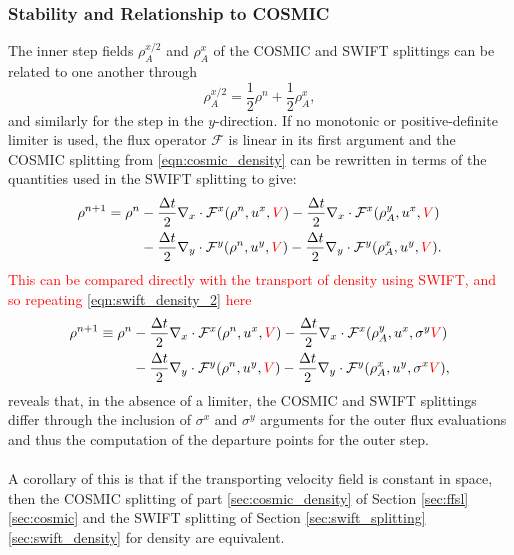 \documentclass{ametsocV6.1}
\newcommand{\change}[1]{\textcolor{red}{#1}}
\begin{document}
\subsubsection{Stability and Relationship to COSMIC}
The inner step fields $\rho_A^{x/2}$ and $\rho_A^{x}$ of the COSMIC and SWIFT splittings can be related to one another through
\begin{equation}
\rho_A^{x/2} = \frac{1}{2}\rho^n + \frac{1}{2}\rho_A^x,
\end{equation}
and similarly for the step in the $y$-direction.
If no monotonic or positive-definite limiter is used, the flux operator $\mathcal{F}$ is linear in its first argument and the COSMIC splitting from \eqref{eqn:cosmic_density} can be rewritten in terms of the quantities used in the SWIFT splitting to give:
\begin{equation} \label{eqn:cosmic_linear}
\begin{split}
\rho^{n+1} = \rho^n & - \frac{\Delta t}{2} \nabla_x\cdot \mathcal{F}^x(\rho^n, u^x,\change{V}) - \frac{\Delta{t}}{2} \nabla_x\cdot \mathcal{F}^x(\rho^y_A, u^x,\change{V}) \\
& - \frac{\Delta{t}}{2} \nabla_y\cdot \mathcal{F}^y(\rho^n, u^y,\change{V}) - \frac{\Delta{t}}{2} \nabla_y\cdot \mathcal{F}^y(\rho^x_A, u^y,\change{V}).
\end{split}
\end{equation}
\change{This can be compared directly with the transport of density using SWIFT, and so repeating \eqref{eqn:swift_density_2} here
\begin{equation}
\begin{split}
\rho^{n+1} \equiv \rho^n & - \frac{\Delta t}{2} \nabla_x\cdot \mathcal{F}^x(\rho^n, u^x, \change{V}) - \frac{\Delta{t}}{2} \nabla_x\cdot \mathcal{F}^x(\rho^y_A, u^x, \sigma^y\change{V}) \\
& - \frac{\Delta{t}}{2} \nabla_y\cdot \mathcal{F}^y(\rho^n, u^y,\change{V}) - \frac{\Delta{t}}{2} \nabla_y\cdot \mathcal{F}^y(\rho^x_A, u^y, \sigma^x\change{V}),
\end{split}
\end{equation}}
reveals that, in the absence of a limiter, the COSMIC and SWIFT splittings differ through the inclusion of $\sigma^x$ and $\sigma^y$ arguments for the outer flux evaluations and thus the computation of the departure points for the outer step.
\\
\\
A corollary of this is that if the transporting velocity field is constant in space, then the COSMIC splitting of part \ref{sec:cosmic_density} of Section \ref{sec:ffsl}\ref{sec:cosmic} and the SWIFT splitting of Section \ref{sec:swift_splitting}\ref{sec:swift_density} for density are equivalent.
\end{document}
